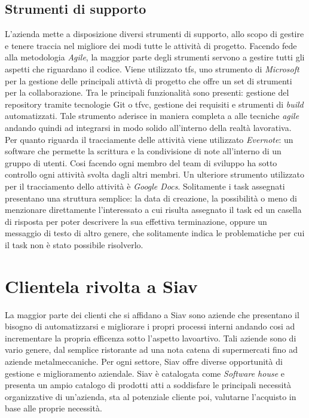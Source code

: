 \subsection{Strumenti di supporto }
L'azienda mette a disposizione diversi strumenti di supporto, allo scopo di gestire e tenere traccia nel migliore dei modi tutte le attività di progetto.
Facendo fede alla metodologia \textit{Agile}, la maggior parte degli strumenti servono a gestire tutti gli aspetti che riguardano il codice. Viene utilizzato \gls{tfs}, uno strumento di \textit{Microsoft} per la gestione delle principali attivtà di progetto che offre un set di strumenti per la collaborazione. Tra le principali funzionalità sono presenti: gestione del repository tramite tecnologie Git o \gls{tfvc}, gestione dei requisiti e strumenti di \textit{build} automatizzati. Tale strumento aderisce in maniera completa a alle tecniche \textit{agile} andando quindi ad integrarsi in modo solido all'interno della realtà lavorativa. Per quanto riguarda il tracciamente delle attività viene utilizzato \textit{Evernote}: un software che permette la scrittura e la condivisione di note all'interno di un gruppo di utenti. Cosi facendo ogni membro del team di sviluppo ha sotto controllo ogni attività svolta dagli altri membri. Un ulteriore strumento utilizzato per il tracciamento dello attività è \textit{Google Docs}. Solitamente i task assegnati presentano una struttura semplice: la data di creazione, la possibilità o meno di menzionare direttamente l'interessato a cui risulta assegnato il task ed un casella di risposta per poter descrivere la sua effettiva terminazione, oppure un messaggio di testo di altro genere, che solitamente indica le problematiche per cui il task non è stato possibile risolverlo. 
\section{Clientela rivolta a Siav}
La maggior parte dei clienti che si affidano a Siav sono aziende che presentano il bisogno di automatizzarsi e migliorare i propri processi interni andando cosi ad incrementare la propria efficenza sotto l'aspetto lavoartivo. Tali aziende sono di vario genere, dal semplice ristorante ad una nota catena di supermercati fino ad aziende metalmeccaniche. Per ogni settore, Siav offre diverse opportunità di gestione e miglioramento aziendale.
Siav è catalogata come \textit{Software house} e presenta un ampio catalogo di prodotti atti a soddisfare le principali necessità organizzative di un'azienda, sta al potenziale cliente poi, valutarne l'acquisto in base alle proprie necessità. 
